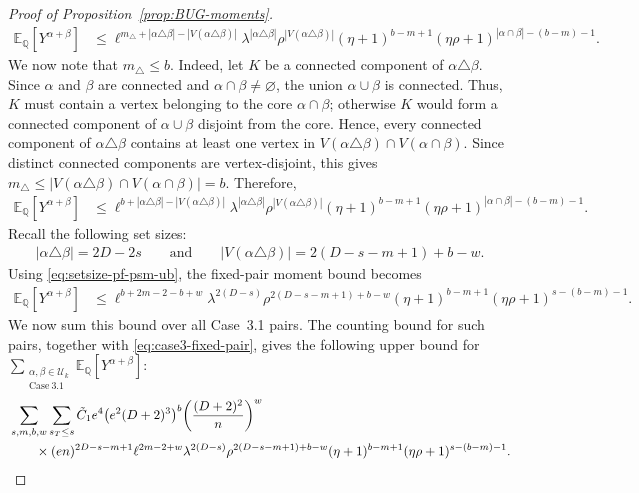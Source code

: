 \documentclass[11pt, letterpaper]{article}
\numberwithin{equation}{section}
\newcommand{\E}{\mathbb{E}}
\newcommand{\QQ}{\mathbb{Q}}
\newcommand{\U}{\mathcal{U}}
\begin{document}
\begin{proof}[Proof of Proposition~\ref{prop:BUG-moments}]
\begin{align*}
    \E_\QQ[Y^{\alpha+\beta}]&\leq \ell^{m_\triangle+|\alpha \triangle \beta|-|V(\alpha \triangle \beta)|}\lambda^{|\alpha \triangle \beta|} \rho^{|V(\alpha \triangle \beta)|} (\eta + 1)^{b-m+1} (\eta \rho + 1)^{|\alpha \cap \beta| - (b - m)-1}.
\end{align*}
%
%
%
We now note that $m_\triangle \le b$. Indeed, let $K$ be a connected component of $\alpha\triangle\beta$. Since $\alpha$ and $\beta$ are connected and $\alpha\cap\beta\neq\varnothing$, the union $\alpha\cup\beta$ is connected. Thus, $K$ must contain a vertex belonging to the core $\alpha\cap\beta$; otherwise $K$ would form a connected component of $\alpha\cup\beta$ disjoint from the core. Hence, every connected component of $\alpha\triangle\beta$ contains at least one vertex in $V(\alpha\triangle\beta)\cap V(\alpha\cap\beta)$. Since distinct connected components are vertex-disjoint, this gives $m_\triangle\le |V(\alpha\triangle\beta)\cap V(\alpha\cap\beta)|=b.$ Therefore,
\begin{align*}
\E_\QQ[Y^{\alpha+\beta}]&\leq \ell^{b+|\alpha \triangle \beta|-|V(\alpha \triangle \beta)|}\lambda^{|\alpha \triangle \beta|} \rho^{|V(\alpha \triangle \beta)|} (\eta + 1)^{b-m+1} (\eta \rho + 1)^{|\alpha \cap \beta| - (b - m)-1}.
\end{align*}
%
Recall the following set sizes:
\begin{align}\label{eq:setsize-pf-psm-ub}
    |\alpha \triangle \beta|=2D-2s \qquad \text{and} \qquad |V(\alpha \triangle \beta)|=2(D-s-m+1)+b-w.
\end{align}
Using \eqref{eq:setsize-pf-psm-ub}, the fixed-pair moment bound becomes
\begin{align}    \label{eq:case3-fixed-pair}
\E_\QQ[Y^{\alpha+\beta}]&\leq \ell^{b+2m-2-b+w}\lambda^{2(D-s)} \rho^{2(D-s-m+1)+b-w} (\eta + 1)^{b-m+1} (\eta \rho + 1)^{s - (b - m)-1}.
\end{align}
We now sum this bound over all Case~3.1 pairs. The counting bound for such pairs,
together with \eqref{eq:case3-fixed-pair}, gives the following upper bound for
$\sum_{\substack{\alpha,\beta \in \U_k \\ \mathrm{Case \ 3.1}}}\E_\QQ[Y^{\alpha+\beta}]$:
{\small
\begin{align}
\notag
&\sum_{s,m,b,w}\sum_{s_T\le s}
\tilde C_1  e^4
\bigl(e^2(D+2)^3\bigr)^b
\bigg(\frac{(D+2)^2}{n}\bigg)^w\\
\notag
&\qquad \times
(en)^{2D-s-m+1}
\ell^{2m-2+w}
\lambda^{2(D-s)}
\rho^{2(D-s-m+1)+b-w}
(\eta+1)^{b-m+1}
(\eta\rho+1)^{s-(b-m)-1}.
\end{align}}

\end{proof}
\end{document}
